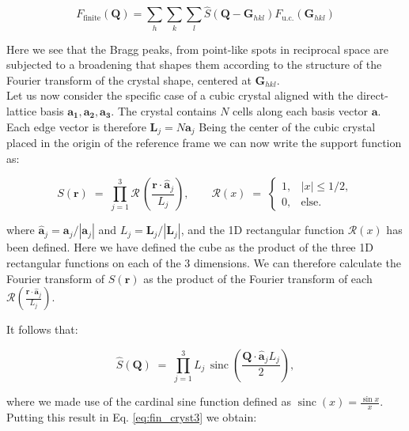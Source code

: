 \begin{equation}
    F_{\text{finite}}(\mathbf{Q}) = 
    \sum_{h} \sum_{k} \sum_{l} \widehat S(\mathbf Q - \mathbf{G}_{hkl})F_{\text{u.c.}}(\mathbf{G}_{hkl})
    \label{eq:fin_cryst3}
\end{equation}

Here we see that the Bragg peaks, from point-like spots in reciprocal space are subjected to a broadening that shapes them 
according to the structure of the Fourier transform of the crystal shape, centered at $\mathbf{G}_{hkl}$. \\

Let us now consider the specific case of a cubic crystal aligned with the direct-lattice basis $\mathbf{a_1},\mathbf{a_2},\mathbf{a_3}$.
The crystal contains $N$ cells along each basis vector $\mathbf{a}$. Each edge vector is therefore $\mathbf{L}_j = N\mathbf{a}_j$ 
Being the center of the cubic crystal placed in the origin of the reference frame we can now write the support function as: 

\begin{equation}
    S(\mathbf r) \;=\; 
    \prod_{j=1}^{3} \mathcal R \,\!\left(\frac{\mathbf{r} \cdot \mathbf{\hat{a}}_j}{L_j}\right),
    \qquad
    \mathcal R(x) \;=\;
    \begin{cases}
    1, & |x| \le 1/2
    , \\[6pt]
    0, & \text{else}.
    \end{cases}
    \label{eq:cube}
\end{equation}

where $\mathbf{\hat{a}}_j = \mathbf{a}_j/|\mathbf{a}_j|$ and $L_j = \mathbf{L}_j/|\mathbf{L}_j|$, and the 1D rectangular function
$ \mathcal R(x)$ has been defined. Here we have defined the cube as the product of the three 1D rectangular functions on each 
of the 3 dimensions. We can therefore calculate the Fourier transform of $S(\mathbf{r})$ as the product of the Fourier 
transform of each $\mathcal{R}\left(\frac{\mathbf{r} \cdot \mathbf{\hat{a}}_j}{L_j}\right)$. 

It follows that: 

\begin{equation}
    \widehat S(\mathbf Q) \;=\; 
    \prod_{j=1}^{3} L_j \,\!\operatorname{sinc}\left(\frac{\mathbf{Q} \cdot \mathbf{\hat{a}}_j L_j}{2}\right),
\end{equation}

where we made use of the cardinal sine function defined as $\operatorname{sinc}(x) = \frac{\sin x}{x}$. 
Putting this result in Eq. \ref{eq:fin_cryst3} we obtain: 

